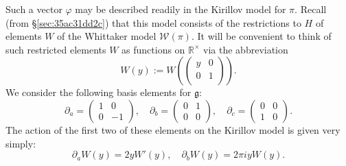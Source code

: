 \documentclass[reqno]{amsart} 
\numberwithin{equation}{section}
\numberwithin{theorem}{section}
\begin{document}
Such a vector $\varphi$ may be described readily in the Kirillov model for $\pi$.  Recall (from \S\ref{sec:35ac31dd2c}) that this model consists of the restrictions to $H$ of elements $W$ of the Whittaker model $\mathcal{W}(\pi)$.  It will be convenient to think of such restricted elements $W$ as functions on $\mathbb{R}^\times$ via the abbreviation
\begin{equation*}
W(y) := W\left(
  \begin{pmatrix}
y & 0 \\
0 & 1 \\
\end{pmatrix} \right).
\end{equation*}
We consider the following basis elements for $\mathfrak{g}$:
\begin{equation*}
  \partial_a =
  \begin{pmatrix}
    1 & 0 \\
    0 & -1
  \end{pmatrix},
  \quad
  \partial_b =
  \begin{pmatrix}
    0 & 1 \\
    0 & 0
  \end{pmatrix},
  \quad
  \partial_c =
  \begin{pmatrix}
    0 & 0 \\
    1 & 0
  \end{pmatrix}  .
\end{equation*}
The action of the first two of these elements on the Kirillov model is given very simply:
\begin{equation*}
  \partial_a W(y) = 2 y W'(y),
  \quad
  \partial_b W(y) = 2 \pi i y W(y).
\end{equation*}
\end{document}
